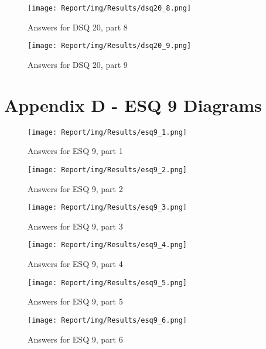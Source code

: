 \documentclass[a4paper,12pt]{article}
\begin{document}
\begin{figure}[ht!]
    \centering
    \texttt{[image: Report/img/Results/dsq20\_8.png]}
    \caption{Answers for DSQ 20, part 8}
    \label{fig:res_devq20_8}
\end{figure}

\begin{figure}[ht!]
    \centering
    \texttt{[image: Report/img/Results/dsq20\_9.png]}
    \caption{Answers for DSQ 20, part 9}
    \label{fig:res_devq20_9}
\end{figure}

\newpage

\section{Appendix D - ESQ 9 Diagrams}
\begin{figure}[ht!]
    \centering
    \texttt{[image: Report/img/Results/esq9\_1.png]}
    \caption{Answers for ESQ 9, part 1}
    \label{fig:res_eduq9_1}
\end{figure}

\begin{figure}[ht!]
    \centering
    \texttt{[image: Report/img/Results/esq9\_2.png]}
    \caption{Answers for ESQ 9, part 2}
    \label{fig:res_eduq9_2}
\end{figure}

\begin{figure}[ht!]
    \centering
    \texttt{[image: Report/img/Results/esq9\_3.png]}
    \caption{Answers for ESQ 9, part 3}
    \label{fig:res_eduq9_3}
\end{figure}

\begin{figure}[ht!]
    \centering
    \texttt{[image: Report/img/Results/esq9\_4.png]}
    \caption{Answers for ESQ 9, part 4}
    \label{fig:res_eduq9_4}
\end{figure}

\begin{figure}[ht!]
    \centering
    \texttt{[image: Report/img/Results/esq9\_5.png]}
    \caption{Answers for ESQ 9, part 5}
    \label{fig:res_eduq9_5}
\end{figure}

\begin{figure}[ht!]
    \centering
    \texttt{[image: Report/img/Results/esq9\_6.png]}
    \caption{Answers for ESQ 9, part 6}
    \label{fig:res_eduq9_6}
\end{figure}
\end{document}
